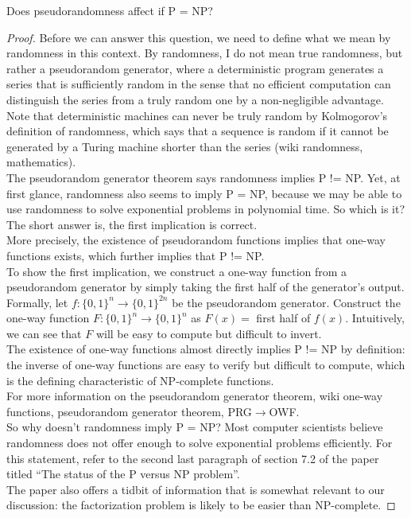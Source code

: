 \begin{question}
  Does pseudorandomness affect if P = NP?
\end{question}

\begin{proof}
  Before we can answer this question, we need to define what we mean by
  randomness in this context. By randomness, I do not mean true
  randomness, but rather a pseudorandom generator, where a deterministic
  program generates a series that is sufficiently random in the sense
  that no efficient computation can distinguish the series from a truly
  random one by a non-negligible advantage. Note that deterministic
  machines can never be truly random by Kolmogorov's definition of
  randomness, which says that a sequence is random if it cannot be
  generated by a Turing machine shorter than the series (wiki
  randomness, mathematics).\\

  The pseudorandom generator theorem says randomness implies P != NP. Yet,
  at first glance, randomness also seems to imply P = NP, because we may
  be able to use randomness to solve exponential problems in polynomial
  time. So which is it? The short answer is, the first implication is
  correct.\\

  More precisely, the existence of pseudorandom functions implies that
  one-way functions exists, which further implies that P != NP.\\

  To show the first implication, we construct a one-way function from a
  pseudorandom generator by simply taking the first half of the
  generator's output. Formally, let $f:\{0,1\}^n \rightarrow
  \{0,1\}^{2n}$ be the pseudorandom generator. Construct the one-way
  function $F:\{0,1\}^n\rightarrow\{0,1\}^n$ as $F(x)=$ first half of
  $f(x)$. Intuitively, we can see that $F$ will be easy to compute but
  difficult to invert.\\

  The existence of one-way functions almost directly implies P != NP by
  definition: the inverse of one-way functions are easy to verify but
  difficult to compute, which is the defining characteristic of
  NP-complete functions.\\

  For more information on the pseudorandom generator theorem, wiki one-way
  functions, pseudorandom generator theorem, PRG$\rightarrow$OWF.\\

  So why doesn't randomness imply P = NP? Most computer scientists believe
  randomness does not offer enough to solve exponential problems
  efficiently. For this statement, refer to the second last paragraph of
  section 7.2 of the paper titled ``The status of the P versus NP
  problem''.\\

  The paper also offers a tidbit of information that is somewhat relevant
  to our discussion: the factorization problem is likely to be easier than
  NP-complete.
\end{proof}
